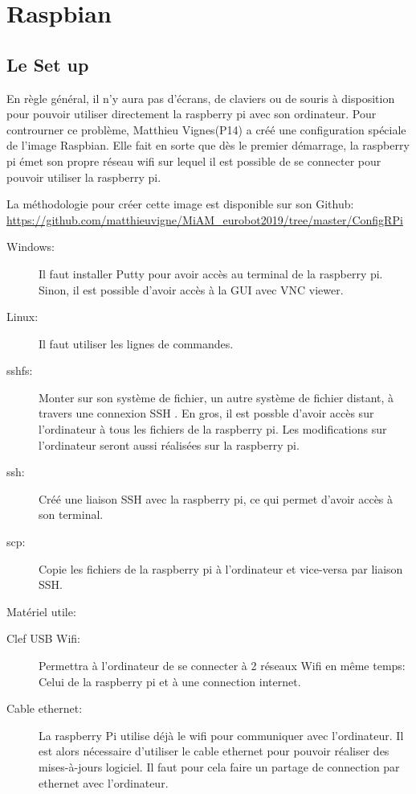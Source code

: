 \documentclass[a4paper, 11pt]{report}
\begin{document}
\chapter{Raspbian}

\section{Le Set up}
En règle général, il n'y aura pas d'écrans, de claviers ou de souris à disposition pour pouvoir utiliser directement la raspberry pi avec son ordinateur. Pour controurner ce problème, Matthieu Vignes(P14) a créé une configuration spéciale de l'image Raspbian.  Elle fait en sorte que dès le premier démarrage, la raspberry pi émet son propre réseau wifi sur lequel il est possible de se connecter pour pouvoir utiliser la raspberry pi.

La méthodologie pour créer cette image est disponible sur son Github:
\url{https://github.com/matthieuvigne/MiAM_eurobot2019/tree/master/ConfigRPi}

\begin{description}
\item[Windows:]Il faut installer Putty pour avoir accès au terminal de la raspberry pi. Sinon, il est possible d'avoir accès à la GUI avec VNC viewer.
\item[Linux:]Il faut utiliser les lignes de commandes.
\end{description}

\begin{description}
\item[sshfs:]Monter sur son système de fichier, un autre système de fichier distant, à travers une connexion SSH . En gros, il est possble d'avoir accès sur l'ordinateur à tous les fichiers de la raspberry pi. Les modifications sur l'ordinateur seront aussi réalisées sur la raspberry pi.
\item[ssh:]Créé une liaison SSH avec la raspberry pi, ce qui permet d'avoir accès à son terminal.
\item[scp:]Copie les fichiers de la raspberry pi à l'ordinateur et vice-versa par liaison SSH. 
\end{description}

Matériel utile:
\begin{description}
\item[Clef USB Wifi:]Permettra à l'ordinateur de se connecter à 2 réseaux Wifi en même temps: Celui de la raspberry pi et à une connection internet.
\item[Cable ethernet:]La raspberry Pi utilise déjà le wifi pour communiquer avec l'ordinateur. Il est alors nécessaire d'utiliser le cable ethernet pour pouvoir réaliser des mises-à-jours logiciel. Il faut pour cela faire un partage de connection par ethernet avec l'ordinateur.
\end{description}
\end{document}
